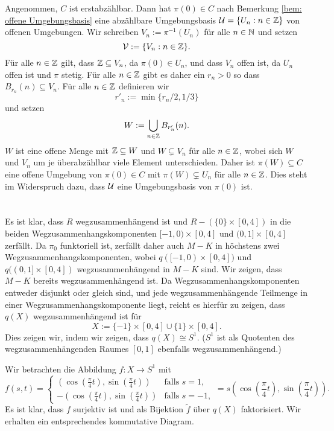 \documentclass[a4paper,10pt]{article}
\begin{document}
Angenommen, $C$ ist erstabzählbar. Dann hat $\pi(0) \in C$ nach Bemerkung \ref{bem: offene Umgebungsbasis} eine abzählbare Umgebungsbasis $\mathcal{U} = \{U_n : n \in \mathbb{Z}\}$ von offenen Umgebungen. Wir schreiben $V_n := \pi^{-1}(U_n)$ für alle $n \in \mathbb{N}$ und setzen
\[
 \mathcal{V} := \{V_n : n \in \mathbb{Z}\}.
\]
Für alle $n \in \mathbb{Z}$ gilt, dass $\mathbb{Z} \subseteq V_n$, da $\pi(0) \in U_n$, und dass $V_n$ offen ist, da $U_n$ offen ist und $\pi$ stetig. Für alle $n \in \mathbb{Z}$ gibt es daher ein $r_n > 0$ so dass $B_{r_n}(n) \subseteq V_n$. Für alle $n \in \mathbb{Z}$ definieren wir
\[
 r'_n := \min\{r_n/2, 1/3\}
\]
und setzen
\[
 W := \bigcup_{n \in \mathbb{Z}} B_{r'_n}(n).
\]
$W$ ist eine offene Menge mit $\mathbb{Z} \subseteq W$ und $W \subsetneq V_n$ für alle $n \in \mathbb{Z}$, wobei sich $W$ und $V_n$ um je überabzählbar viele Element unterschieden. Daher ist $\pi(W) \subseteq C$ eine offene  Umgebung von $\pi(0) \in C$ mit $\pi(W) \subsetneq U_n$ für alle $n \in \mathbb{Z}$. Dies steht im Widerspruch dazu, dass $\mathcal{U}$ eine Umgebungsbasis von $\pi(0)$ ist.





\section{}


\addtocounter{subsection}{1}


\subsection{}
Es ist klar, dass $R$ wegzusammenhängend ist und $R - (\{0\} \times [0,4])$ in die beiden Wegzusammenhangskomponenten $[-1,0) \times [0,4]$ und $(0,1] \times [0,4]$ zerfällt. Da $\pi_0$ funktoriell ist, zerfällt daher auch $M-K$ in höchstens zwei Wegzusammenhangskomponenten, wobei $q([-1,0) \times [0,4])$ und $q((0,1] \times [0,4])$ wegzu\-sammen\-hängend in $M-K$ sind. Wir zeigen, dass $M-K$ bereits wegzusammenhängend ist. Da Wegzusammenhangskomponenten entweder disjunkt oder gleich sind, und jede wegzusammenhängende Teilmenge in einer Wegzusammenhangskomponente liegt, reicht es hierfür zu zeigen, dass $q(X)$ wegzusammenhängend ist für
\[
 X := \{-1\} \times [0,4] \cup \{1\} \times [0,4].
\]
Dies zeigen wir, indem wir zeigen, dass $q(X) \cong S^1$. ($S^1$ ist als Quotenten des wegzusammenhängenden Raumes $[0,1]$ ebenfalls wegzusammenhängend.)

Wir betrachten die Abbildung $f : X \to S^1$ mit
\[
f(s,t)
=
\begin{cases}
   \left(\cos\left(\frac{\pi}{4}t\right),\sin\left(\frac{\pi}{4}t\right)\right) & \text{falls } s = 1, \\
 - \left(\cos\left(\frac{\pi}{4}t\right),\sin\left(\frac{\pi}{4}t\right)\right) & \text{falls } s = -1,
\end{cases}
=  s \left(\cos\left(\frac{\pi}{4}t\right),\sin\left(\frac{\pi}{4}t\right)\right).
\]
Es ist klar, dass $f$ surjektiv ist und als Bijektion $\tilde{f}$ über $q(X)$ faktorisiert. Wir erhalten ein entsprechendes kommutative Diagram.
\end{document}
